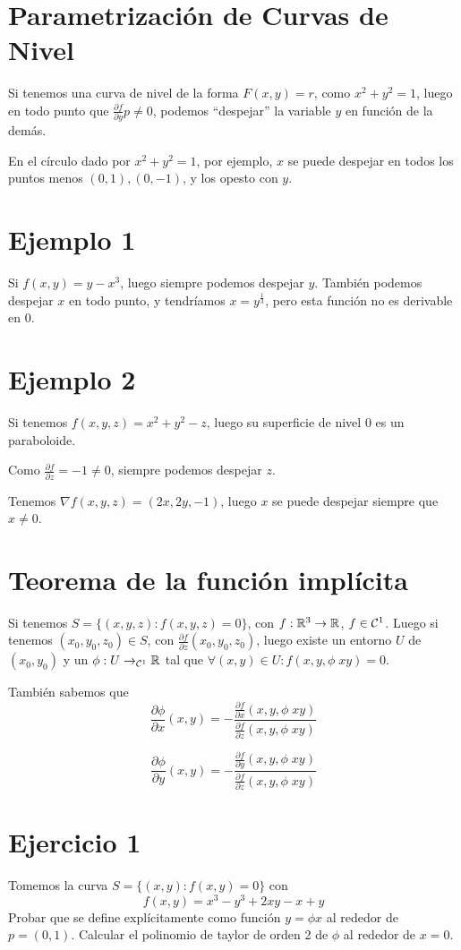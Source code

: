 \documentclass{article}
\begin{document}
\section*{Parametrización de Curvas de Nivel}
Si tenemos una curva de nivel de la forma $F(x,y) = r$, como $x^2 + y^2 = 1$, luego en todo punto que $\frac{\partial f}{\partial y}p \neq 0$, podemos ``despejar'' la variable $y$ en función de la demás.

En el círculo dado por $x^2 + y^2 = 1$, por ejemplo, $x$ se puede despejar en todos los puntos menos $(0, 1), (0, -1)$, y los opesto con $y$.

\section*{Ejemplo 1}
Si $f(x,y) = y-x^3$, luego siempre podemos despejar $y$.
También podemos despejar $x$ en todo punto, y tendríamos $x = y^\frac{1}{3} $, pero esta función no es derivable en $0$.

\section*{Ejemplo 2}
Si tenemos $f(x,y,z) = x^2 + y^2 - z$, luego su superficie de nivel $0$ es un paraboloide.

Como $\frac{\partial f}{\partial z} = -1 \neq 0$, siempre podemos despejar $z$.

Tenemos $\nabla f(x,y,z) = (2x, 2y, -1)$, luego $x$ se puede despejar siempre que $x \neq 0$.

\section*{Teorema de la función implícita}
Si tenemos $S = \{(x,y,z) : f(x,y,z) = 0\}$, con $f : \mathbb{R}^3 \to \mathbb{R}$, $f \in \mathcal{C}^1$.
Luego si tenemos $(x_0, y_0, z_0) \in S$, con $\frac{\partial f}{\partial z} (x_0, y_0, z_0)$, luego existe un entorno $U$ de $(x_0, y_0)$ y un $\phi : U \to_{\mathcal{C}^1} \mathbb{R}$ tal que $\forall (x,y) \in U: f(x, y, \phi \; x y) = 0$.

También sabemos que
\[\frac{\partial \phi}{\partial x}(x,y) = -\frac{\frac{\partial f}{\partial x}(x,y,  \phi \; xy)}{\frac{\partial f}{\partial z}(x, y, \phi \;xy)}\]

\[\frac{\partial \phi}{\partial y}(x,y) = -\frac{\frac{\partial f}{\partial y}(x,y,  \phi \; xy)}{\frac{\partial f}{\partial z}(x, y, \phi \;xy)}\]

\section*{Ejercicio 1}
Tomemos la curva $S = \{(x,y) : f(x,y) = 0\}$ con
\[f(x,y) = x^3-y^3 + 2xy - x + y\]
Probar que se define explícitamente como función $y = \phi x$ al rededor de $p = (0, 1)$. Calcular el polinomio de taylor de orden 2 de $\phi$ al rededor de $x = 0$.
\end{document}

